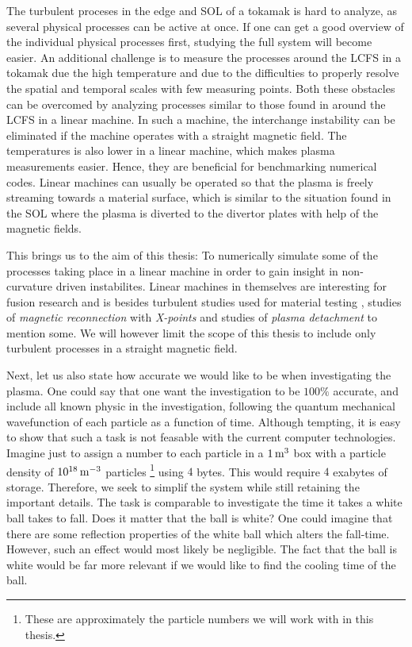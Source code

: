 The turbulent proceses in the edge and SOL of a tokamak is hard to analyze, as several physical processes can be active at once.
If one can get a good overview of the individual physical processes first, studying the full system will become easier.
An additional challenge is to measure the processes around the LCFS in a tokamak due the high temperature and due to the difficulties to properly resolve the spatial and temporal scales with few measuring points.
Both these obstacles can be overcomed by analyzing processes similar to those found in around the LCFS in a linear machine.
In such a machine, the interchange instability can be eliminated if the machine operates with a straight magnetic field.
The temperatures is also lower in a linear machine, which makes plasma measurements easier.
Hence, they are beneficial for benchmarking numerical codes.
Linear machines can usually be operated so that the plasma is freely streaming towards a material surface, which is similar to the situation found in the SOL where the plasma is diverted to the divertor plates with help of the magnetic fields.

This brings us to the aim of this thesis:
To numerically simulate some of the processes taking place in a linear machine in order to gain insight in non-curvature driven instabilites.
Linear machines in themselves are interesting for fusion research and is besides turbulent studies used for material testing \cite{Rapp2010}, studies of \emph{magnetic reconnection} with \emph{X-points} \cite{Bohlin2014} and studies of \emph{plasma detachment} \cite{Ohno2017} to mention some.
We will however limit the scope of this thesis to include only turbulent processes in a straight magnetic field.

Next, let us also state how accurate we would like to be when investigating the plasma.
One could say that one want the investigation to be $100 \%$ accurate, and include all known physic in the investigation, following the quantum mechanical wavefunction of each particle as a function of time.
Although tempting, it is easy to show that such a task is not feasable with the current computer technologies.
Imagine just to assign a number to each particle in a $1\, \text{m}^3$ box with a particle density of $10^{18} \, \text{m}^{-3}$ particles%
\footnote{These are approximately the particle numbers we will work with in this thesis.}%
%
using $4$ bytes.
This would require $4$ exabytes of storage.
Therefore, we seek to simplif the system while still retaining the important details.
The task is comparable to investigate the time it takes a white ball takes to fall.
Does it matter that the ball is white?
One could imagine that there are some reflection properties of the white ball which alters the fall-time.
However, such an effect would most likely be negligible.
The fact that the ball is white would be far more relevant if we would like to find the cooling time of the ball.


